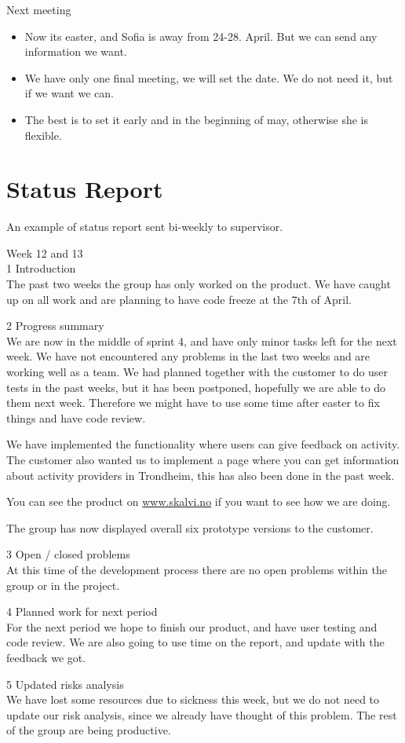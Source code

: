 {\large{Next meeting}}
\begin{itemize}
\setlength\itemsep{-0.7em}
    \item Now its easter, and Sofia is away from 24-28. April. But we can send any information we want. 
    \item We have only one final meeting, we will set the date. We do not need it, but if we want we can. 
    \item The best is to set it early and in the beginning of may, otherwise she is flexible. 
\end{itemize}


\section{Status Report}
\label{status_report}

An example of status report sent bi-weekly to supervisor.

{\Large{Week 12 and 13}}\\

{\large{1 Introduction}}\\
The past two weeks the group has only worked on the product. We have caught up on all work and are planning to have code freeze at the 7th of April.

{\large{2 Progress summary}}\\					
We are now in the middle of sprint 4, and have only minor tasks left for the next week. We have not encountered any problems in the last two weeks and are working well as a team.  We had planned together with the customer to do user tests in the past weeks, but it has been postponed, hopefully we are able to do them next week. Therefore we might have to use some time after easter to fix things and have code review. 

We have implemented the functionality where users can give feedback on activity. The customer also wanted us to implement a page where you can get information about activity providers in Trondheim, this has also been done in the past week.

You can see the product on \url{www.skalvi.no} if you want to see how we are doing. 

The group has now displayed overall six prototype versions to the customer. 

{\large{3 Open / closed problems}}\\
At this time of the development process there are no open problems within the group or in the project.

{\large{4 Planned work for next period}}\\
For the next period we hope to finish our product, and have user testing and code review. We are also going to use time on the report, and update with the feedback we got.

{\large{5 Updated risks analysis}}\\
We have lost some resources due to sickness this week, but we do not need to update our risk analysis, since we already have thought of this problem. The rest of the group are being productive.

\clearpage